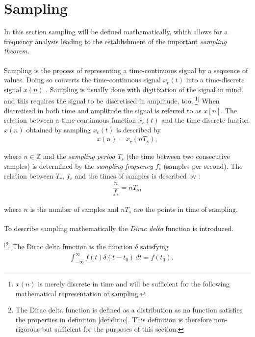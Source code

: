 \section{Sampling} \label{sec:sampling}
In this section sampling will be defined mathematically, which allows for a frequency analysis leading to the establishment of the important \textit{sampling theorem}.
\\ \\
Sampling is the process of representing a time-continuous signal by a sequence of values. Doing so converts the time-continuous signal $x_c(t)$ into a time-discrete signal $x(n)$ \cite{page 5, pelgrom}. Sampling is usually done with digitization of the signal in mind, and this requires the signal to be discretised in amplitude, too.$^[$\footnote{$x(n)$ is merely discrete in time and will be sufficient for the following mathematical representation of sampling.}$^]$ When discretised in both time and amplitude the signal is referred to as $x[n]$. The relation between a time-continuous function $x_c(t)$ and the time-discrete funtion $x(n)$ obtained by sampling $x_c(t)$ is described by
\begin{align} \label{eq:sampling_principle}
x(n)=x_c(nT_s),
\end{align}

where $n \in \mathbb{Z}$ and the \textit{sampling period} $T_s$ (the time between two consecutive samples) is determined by the \textit{sampling frequency} $f_s$ (samples per second). The relation between $T_s$, $f_s$ and the times of samples is described by \cite{page 163, pelgrom}:
\begin{align} \label{eq:sample_freq}
\dfrac{n}{f_s} = nT_s,
\end{align}

where $n$ is the number of samples and $nT_s$ are the points in time of sampling.
\\ \\
To describe sampling mathematically the \textit{Dirac delta} function is introduced.

\begin{definition}$^[$\footnote{The Dirac delta function is defined as a distribution as no function satisfies the properties in definition \ref{def:dirac}. This definition is therefore non-rigorous but sufficient for the purposes of this section.}$^]$ \label{def:dirac}
The Dirac delta function is the function $\delta$ satisfying
\begin{align}
\int_{-\infty}^{\infty} \! f(t)\delta(t-t_0) \, dt=f(t_0).\phantom{mm}
\end{align}
\end{definition}

